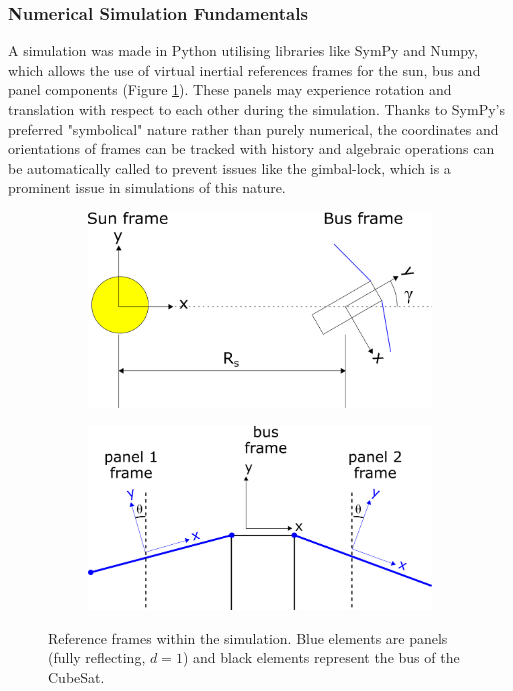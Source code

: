 \subsubsection{Numerical Simulation Fundamentals}\label{background:sim}

A simulation was made in Python utilising libraries like SymPy and Numpy, which allows the use of virtual inertial references frames for the sun, bus and panel components (Figure \ref{fig:sim_frames}). These panels may experience rotation and translation with respect to each other during the simulation. Thanks to SymPy's preferred "symbolical" nature rather than purely numerical, the coordinates and orientations of frames can be tracked with history and algebraic operations can be automatically called to prevent issues like the gimbal-lock, which is a prominent issue in simulations of this nature.


\begin{figure}[!htb]
\centering
\begin{subfigure}{0.5\textwidth}
  \centering
  \includegraphics[width=0.7\linewidth]{images/sun bus frames.png}
\end{subfigure}%
\begin{subfigure}{.5\textwidth}
  \centering
  \includegraphics[width=0.7\linewidth]{images/bus panel frames.png}
\end{subfigure}
\caption{Reference frames within the simulation. Blue elements are panels (fully reflecting, $d = 1$) and black elements represent the bus of the CubeSat.}
\label{fig:sim_frames}
\end{figure}

